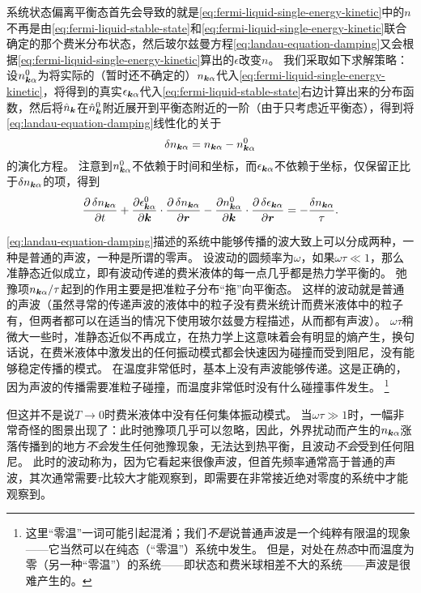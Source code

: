 系统状态偏离平衡态首先会导致的就是\eqref{eq:fermi-liquid-single-energy-kinetic}中的$n$不再是由\eqref{eq:fermi-liquid-stable-state}和\eqref{eq:fermi-liquid-single-energy-kinetic}联合确定的那个费米分布状态，然后玻尔兹曼方程\eqref{eq:landau-equation-damping}又会根据\eqref{eq:fermi-liquid-single-energy-kinetic}算出的$\epsilon$改变$n$。
我们采取如下求解策略：设${n}^0_{\vb*{k} \alpha}$为将实际的（暂时还不确定的）${n}_{\vb*{k} \alpha}$代入\eqref{eq:fermi-liquid-single-energy-kinetic}，将得到的真实$\epsilon_{\vb*{k} \alpha}$代入\eqref{eq:fermi-liquid-stable-state}右边计算出来的分布函数，然后将$\hat{n}_{\vb*{k}}$在$\hat{n}^0_{\vb*{k}}$附近展开到平衡态附近的一阶（由于只考虑近平衡态），得到将\eqref{eq:landau-equation-damping}线性化的关于
\begin{equation}
    \var{n_{\vb*{k} \alpha}} = n_{\vb*{k} \alpha} - n_{\vb*{k} \alpha}^0
\end{equation}
的演化方程。
注意到$n_{\vb*{k} \alpha}^0$不依赖于时间和坐标，而$\epsilon_{\vb*{k} \alpha}$不依赖于坐标，仅保留正比于$\var{n}_{\vb*{k} \alpha}$的项，得到
\begin{equation}
    \pdv{\var{n}_{\vb*{k} \alpha}}{t} + \pdv{\epsilon^0_{\vb*{k} \alpha}}{\vb*{k}} \cdot \pdv{\var{n_{\vb*{k} \alpha}}}{\vb*{r}} - \pdv{n^0_{\vb*{k} \alpha}}{\vb*{k}} \cdot \pdv{\var{\epsilon_{\vb*{k} \alpha}}}{\vb*{r}} = - \frac{\var{n}_{\vb*{k} \alpha}}{\tau}.
    \label{eq:delta-from-stable-fermi-liquid}
\end{equation}

\eqref{eq:landau-equation-damping}描述的系统中能够传播的波大致上可以分成两种，一种是普通的声波，一种是所谓的零声。
设波动的圆频率为$\omega$，如果$\omega \tau \ll 1$，那么准静态近似成立，即有波动传递的费米液体的每一点几乎都是热力学平衡的。
弛豫项$n_{\vb*{k} \alpha} / \tau$起到的作用主要是把准粒子分布“拖”向平衡态。
这样的波动就是普通的声波（虽然寻常的传递声波的液体中的粒子没有费米统计而费米液体中的粒子有，但两者都可以在适当的情况下使用玻尔兹曼方程描述，从而都有声波）。%
$\omega \tau$稍微大一些时，准静态近似不再成立，在热力学上这意味着会有明显的熵产生，换句话说，在费米液体中激发出的任何振动模式都会快速因为碰撞而受到阻尼，没有能够稳定传播的模式。
在温度非常低时，基本上没有声波能够传递。这是正确的，因为声波的传播需要准粒子碰撞，而温度非常低时没有什么碰撞事件发生。%
\footnote{
    这里“零温”一词可能引起混淆；我们\emph{不是}说普通声波是一个纯粹有限温的现象——它当然可以在纯态（“零温”）系统中发生。
    但是，对处在\emph{热态}中而温度为零（另一种“零温”）的系统——即状态和费米球相差不大的系统——声波是很难产生的。
}%

但这并不是说$T \to 0$时费米液体中没有任何集体振动模式。
当$\omega \tau \gg 1$时，一幅非常奇怪的图景出现了：此时弛豫项几乎可以忽略，因此，外界扰动而产生的$n_{\vb*{k} \alpha}$涨落传播到的地方\emph{不会}发生任何弛豫现象，无法达到热平衡，且波动\emph{不会}受到任何阻尼。
此时的波动称为，因为它看起来很像声波，但首先频率通常高于普通的声波，其次通常需要$\tau$比较大才能观察到，即需要在非常接近绝对零度的系统中才能观察到。

